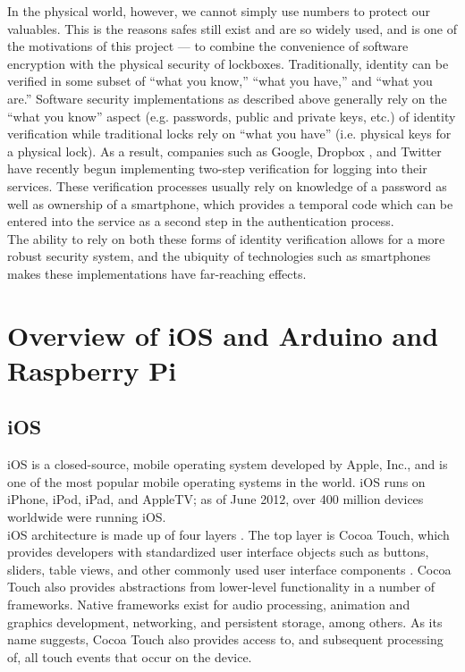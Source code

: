 \documentclass[10pt]{article}
\begin{document}
\begin{multicols}{2}
In the physical world, however, we cannot simply use numbers to protect our valuables. This is the reasons safes still exist and are so widely used, and is one of the motivations of this project --- to combine the convenience of software encryption with the physical security of lockboxes. Traditionally, identity can be verified in some subset of ``what you know,'' ``what you have,'' and ``what you are.''  \cite{codinghorror} Software security implementations as described above generally rely on the ``what you know'' aspect (e.g. passwords, public and private keys, etc.) of identity verification while traditional locks rely on ``what you have'' (i.e. physical keys for a physical lock). As a result, companies  such as Google, Dropbox \cite{dropboxtwostep}, and Twitter \cite{twittertwostep} have recently begun implementing two-step verification for logging into their services. These verification processes usually rely on knowledge of a password as well as ownership of a smartphone, which provides a temporal code which can be entered into the service as a second step in the authentication process. \\

The ability to rely on both these forms of identity verification allows for a more robust security system, and the ubiquity of technologies such as smartphones makes these implementations have far-reaching effects.\\

\section{Overview of iOS and Arduino and Raspberry Pi}

\subsection{iOS}

iOS is a closed-source, mobile operating system developed by Apple, Inc., and is one of the most popular mobile operating systems in the world. iOS runs on iPhone, iPod, iPad, and AppleTV; as of June 2012, over 400 million devices worldwide were running iOS. \cite{applenums}\\

iOS architecture is made up of four layers \cite{iosoverview}. The top layer is Cocoa Touch, which provides developers with standardized user interface objects such as buttons, sliders, table views, and other commonly used user interface components \cite{cocoatouch}. Cocoa Touch also provides abstractions from lower-level functionality in a number of frameworks. Native frameworks exist for audio processing, animation and graphics development, networking, and persistent storage, among others. As its name suggests, Cocoa Touch also provides access to, and subsequent processing of, all touch events that occur on the device.\\


\end{multicols}
\end{document}
